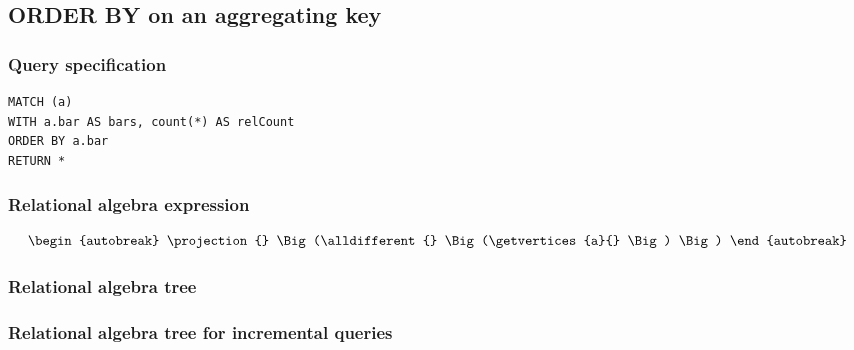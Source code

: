 
\subsection{ORDER BY on an aggregating key}

\subsubsection*{Query specification}

\begin{lstlisting}
MATCH (a)
WITH a.bar AS bars, count(*) AS relCount
ORDER BY a.bar
RETURN *
\end{lstlisting}

\subsubsection*{Relational algebra expression}

\begin{align*}
\begin{autobreak}
\projection{} \Big(\alldifferent{} \Big(\getvertices{a}{}
\Big)
\Big)
\end{autobreak}
\end{align*}

\subsubsection*{Relational algebra tree}


\subsubsection*{Relational algebra tree for incremental queries}


